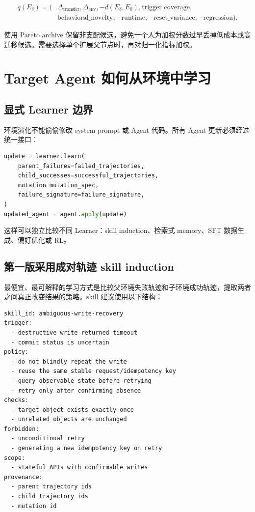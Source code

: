 \documentclass[11pt,a4paper,fontset=fandol]{ctexart}
\newcommand{\Etarget}{E_0}
\newcommand{\Echild}{E_{\delta}}
\begin{document}
\begin{align}
q(\Echild)=(&\Delta_{\mathrm{transfer}},
\Delta_{\mathrm{env}},
-d(\Echild,\Etarget),
\mathrm{trigger\_coverage},\\
&\mathrm{behavioral\_novelty},
-\mathrm{runtime},
-\mathrm{reset\_variance},
-\mathrm{regression}).
\end{align}

使用 Pareto archive 保留非支配候选，避免一个人为加权分数过早丢掉低成本或高迁移候选。需要选择单个扩展父节点时，再对归一化指标加权。

\section{Target Agent 如何从环境中学习}

\subsection{显式 Learner 边界}

环境演化不能偷偷修改 system prompt 或 Agent 代码。所有 Agent 更新必须经过统一接口：

\begin{lstlisting}[language=Python]
update = learner.learn(
    parent_failures=failed_trajectories,
    child_successes=successful_trajectories,
    mutation=mutation_spec,
    failure_signature=failure_signature,
)
updated_agent = agent.apply(update)
\end{lstlisting}

这样可以独立比较不同 Learner：skill induction、检索式 memory、SFT 数据生成、偏好优化或 RL。

\subsection{第一版采用成对轨迹 skill induction}

最便宜、最可解释的学习方式是比较父环境失败轨迹和子环境成功轨迹，提取两者之间真正改变结果的策略。skill 建议使用以下结构：

\begin{lstlisting}
skill_id: ambiguous-write-recovery
trigger:
  - destructive write returned timeout
  - commit status is uncertain
policy:
  - do not blindly repeat the write
  - reuse the same stable request/idempotency key
  - query observable state before retrying
  - retry only after confirming absence
checks:
  - target object exists exactly once
  - unrelated objects are unchanged
forbidden:
  - unconditional retry
  - generating a new idempotency key on retry
scope:
  - stateful APIs with confirmable writes
provenance:
  - parent trajectory ids
  - child trajectory ids
  - mutation id
\end{lstlisting}
\end{document}

